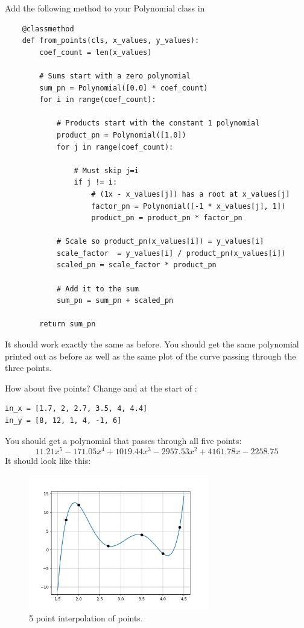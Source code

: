 Add the following method to your Polynomial class in 
\begin{Verbatim}
    @classmethod
    def from_points(cls, x_values, y_values):
        coef_count = len(x_values)

        # Sums start with a zero polynomial
        sum_pn = Polynomial([0.0] * coef_count)
        for i in range(coef_count):

            # Products start with the constant 1 polynomial
            product_pn = Polynomial([1.0])
            for j in range(coef_count):

                # Must skip j=i
                if j != i:
                    # (1x - x_values[j]) has a root at x_values[j]
                    factor_pn = Polynomial([-1 * x_values[j], 1])
                    product_pn = product_pn * factor_pn
                    
            # Scale so product_pn(x_values[i]) = y_values[i]
            scale_factor  = y_values[i] / product_pn(x_values[i])
            scaled_pn = scale_factor * product_pn

            # Add it to the sum
            sum_pn = sum_pn + scaled_pn
            
        return sum_pn  
\end{Verbatim}

It should work exactly the same as before.  You should get the same
polynomial printed out as before as well as the same plot of the
curve passing through the three points.

How about five points? Change  and  at the
start of :
\begin{Verbatim}
in_x = [1.7, 2, 2.7, 3.5, 4, 4.4]
in_y = [8, 12, 1, 4, -1, 6]
\end{Verbatim}

You should get a polynomial that passes through all five points:
\begin{equation*}
11.21x^5 - 171.05x^4 + 1019.44x^3 - 2957.53x^2 + 4161.78x - 2258.75  
\end{equation*}
It should look like this:

\begin{figure}[htbp]
    \centering
    \includegraphics[width=0.7\textwidth]{fiveinterp.png}
    \caption{5 point interpolation of points.}
    \label{fig:fiveinterp}
\end{figure}
